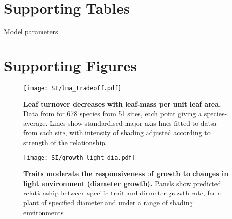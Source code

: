 \documentclass[10pt,twoside]{article}\usepackage[]{graphicx}\usepackage[]{color}
\date{}
\begin{document}
\maketitle

\tableofcontents

\renewcommand{\thefigure}{S\arabic{figure}}
\renewcommand{\thetable}{S\arabic{table}}
\setcounter{secnumdepth}{0}

\clearpage

\section{Supporting Tables}\label{app:supp_info_table}



\begin{table}[ht]
\caption{Model parameters}
\centering
{\footnotesize  %
\begin{doublespace}
% 

\end{doublespace}
}
\label{tab:params}
\end{table}

\newpage

\section{Supporting Figures}\label{app:supp_info_figures}

\begin{figure}[ht]
\centering
\texttt{[image: SI/lma\_tradeoff.pdf]}
\caption{\textbf{Leaf turnover decreases with leaf-mass per unit leaf area.}
Data from \citep{Wright-2004} for 678 species from 51 sites, each
point giving a species-average. Lines show standardised major axis lines
fitted to datsa from each site, with intensity of shading adjusted
according to strength of the relationship.\label{fS-leaf}}
\end{figure}

\newpage


\begin{figure}[ht]
\centering
\texttt{[image: SI/growth\_light\_dia.pdf]}
\caption{\textbf{Traits moderate the responsiveness of growth to changes
in light environment (diameter growth).} Panels show predicted relationship between
specific trait and diameter growth rate, for a plant of specified
diameter and under a range of shading environments.
\label{fig:growth_light_dia}}
\end{figure}
\end{document}

